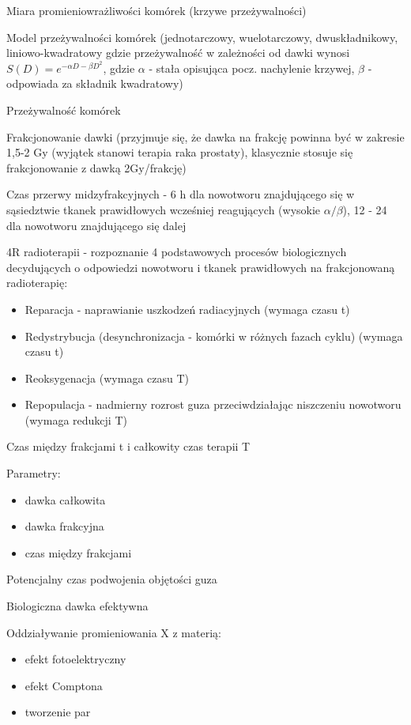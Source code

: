 \documentclass{article}
\begin{document}
Miara promieniowrażliwości komórek (krzywe przeżywalności)

Model przeżywalności komórek (jednotarczowy, wuelotarczowy, dwuskładnikowy, liniowo-kwadratowy gdzie przeżywalność w zależności od dawki wynosi $S(D) = e^{-\alpha D - \beta D^2}$, gdzie $\alpha$ - stała opisująca pocz. nachylenie krzywej, $\beta$ - odpowiada za składnik kwadratowy)

Przeżywalność komórek

Frakcjonowanie dawki (przyjmuje się, że dawka na frakcję powinna być w zakresie 1,5-2 Gy (wyjątek stanowi terapia raka prostaty), klasycznie stosuje się frakcjonowanie z dawką 2Gy\slash frakcję)

Czas przerwy midzyfrakcyjnych - 6 h dla nowotworu znajdującego się w sąsiedztwie tkanek prawidłowych wcześniej reagujących (wysokie $\alpha / \beta$), 12 - 24 dla nowotworu znajdującego się dalej

4R radioterapii - rozpoznanie 4 podstawowych procesów biologicznych decydujących o odpowiedzi nowotworu i tkanek prawidłowych na frakcjonowaną radioterapię:
\begin{itemize}
    \item Reparacja - naprawianie uszkodzeń radiacyjnych (wymaga czasu t)
    \item Redystrybucja (desynchronizacja - komórki w różnych fazach cyklu) (wymaga czasu t)
    \item Reoksygenacja (wymaga czasu T)
    \item Repopulacja - nadmierny rozrost guza przeciwdziałając niszczeniu nowotworu (wymaga redukcji T)
\end{itemize}

Czas między frakcjami t i całkowity czas terapii T

Parametry:
\begin{itemize}
    \item dawka całkowita
    \item dawka frakcyjna
    \item czas między frakcjami
\end{itemize}

Potencjalny czas podwojenia objętości guza

Biologiczna dawka efektywna

Oddziaływanie promieniowania X z materią:
\begin{itemize}
    \item efekt fotoelektryczny
    \item efekt Comptona
    \item tworzenie par
\end{itemize}
\end{document}
